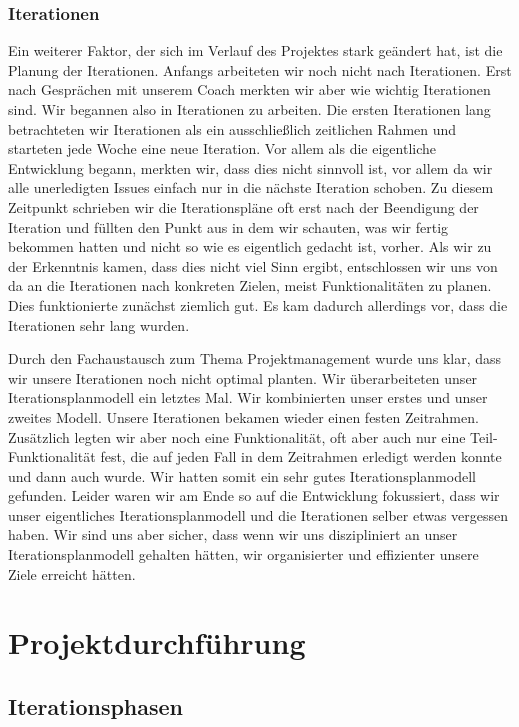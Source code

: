 \documentclass[10pt]{article}
\begin{document}
\subsubsection{Iterationen}
Ein weiterer Faktor, der sich im Verlauf des Projektes stark geändert hat, ist die Planung der Iterationen.
Anfangs arbeiteten wir noch nicht nach Iterationen. Erst nach Gesprächen mit unserem Coach merkten wir aber
wie wichtig Iterationen sind. Wir begannen also in Iterationen zu arbeiten. Die ersten Iterationen lang
betrachteten wir Iterationen als ein ausschließlich zeitlichen Rahmen und starteten jede Woche eine neue Iteration.
Vor allem als die eigentliche Entwicklung begann, merkten wir, dass dies nicht sinnvoll ist, vor allem
da wir alle unerledigten Issues einfach nur in die nächste Iteration schoben. Zu diesem Zeitpunkt schrieben wir
die Iterationspläne oft erst nach der Beendigung der Iteration und füllten den Punkt  aus in dem
wir schauten, was wir fertig bekommen hatten und nicht so wie es eigentlich gedacht ist, vorher.
Als wir zu der Erkenntnis kamen, dass dies nicht viel Sinn ergibt, entschlossen wir uns von da an
die Iterationen nach konkreten Zielen, meist Funktionalitäten zu planen. Dies funktionierte zunächst ziemlich gut.
Es kam dadurch allerdings vor, dass die Iterationen sehr lang wurden.\par
\medskip
Durch den Fachaustausch zum Thema Projektmanagement wurde uns klar, dass wir unsere Iterationen noch nicht optimal planten.
Wir überarbeiteten unser Iterationsplanmodell ein letztes Mal. Wir kombinierten unser erstes und unser zweites Modell.
Unsere Iterationen bekamen wieder einen festen Zeitrahmen. Zusätzlich legten wir aber noch eine Funktionalität, oft
aber auch nur eine Teil-Funktionalität fest, die auf jeden Fall in dem Zeitrahmen erledigt werden konnte und dann auch wurde.
Wir hatten somit ein sehr gutes Iterationsplanmodell gefunden. Leider waren wir am Ende so auf die
Entwicklung fokussiert, dass wir unser eigentliches Iterationsplanmodell und die Iterationen selber etwas vergessen
haben. Wir sind uns aber sicher, dass wenn wir uns diszipliniert an unser Iterationsplanmodell gehalten hätten,
wir organisierter und effizienter unsere Ziele erreicht hätten.

\section{Projektdurchführung}
\subsection{Iterationsphasen}
\end{document}

